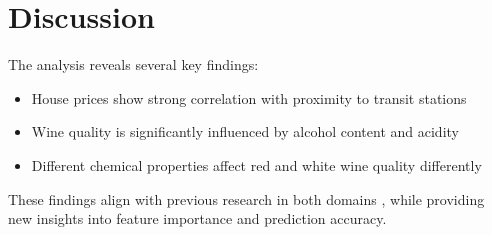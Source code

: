 \section{Discussion}
The analysis reveals several key findings:
\begin{itemize}
    \item House prices show strong correlation with proximity to transit stations
    \item Wine quality is significantly influenced by alcohol content and acidity
    \item Different chemical properties affect red and white wine quality differently
\end{itemize}

These findings align with previous research in both domains \cite{sklearn_api}, while providing new insights into feature importance and prediction accuracy. 